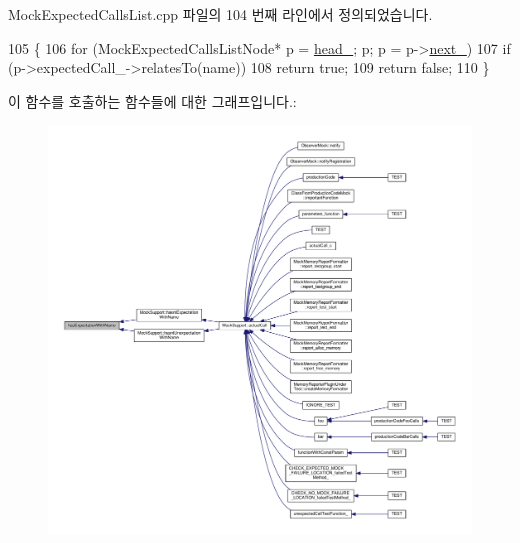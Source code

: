 Mock\+Expected\+Calls\+List.\+cpp 파일의 104 번째 라인에서 정의되었습니다.


\begin{DoxyCode}
105 \{
106         \textcolor{keywordflow}{for} (MockExpectedCallsListNode* p = \hyperlink{class_mock_expected_calls_list_a18290c3c0a206882dd8e0d9f446e2fe6}{head\_}; p; p = p->\hyperlink{class_mock_expected_calls_list_1_1_mock_expected_calls_list_node_aaae452a372ae14c06a6d5d252df73725}{next\_})
107             \textcolor{keywordflow}{if} (p->expectedCall\_->relatesTo(name))
108                 \textcolor{keywordflow}{return} \textcolor{keyword}{true};
109     \textcolor{keywordflow}{return} \textcolor{keyword}{false};
110 \}
\end{DoxyCode}


이 함수를 호출하는 함수들에 대한 그래프입니다.\+:
\nopagebreak
\begin{figure}[H]
\begin{center}
\leavevmode
\includegraphics[width=350pt]{class_mock_expected_calls_list_abc07f8d24b76a0d76aba12c8307bf90f_icgraph}
\end{center}
\end{figure}


